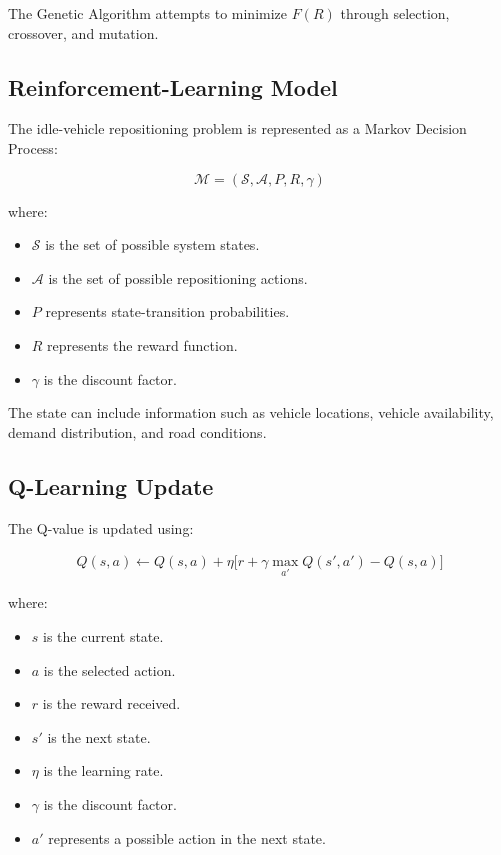 \documentclass[12pt,a4paper]{article}
\begin{document}
The Genetic Algorithm attempts to minimize $F(R)$ through selection,
crossover, and mutation.





\subsection{Reinforcement-Learning Model}

The idle-vehicle repositioning problem is represented as a Markov
Decision Process:

\begin{equation}
    \mathcal{M}
    =
    (\mathcal{S},\mathcal{A},P,R,\gamma)
    \label{eq:mdp}
\end{equation}

where:

\begin{itemize}
    \item $\mathcal{S}$ is the set of possible system states.
    \item $\mathcal{A}$ is the set of possible repositioning actions.
    \item $P$ represents state-transition probabilities.
    \item $R$ represents the reward function.
    \item $\gamma$ is the discount factor.
\end{itemize}

The state can include information such as vehicle locations,
vehicle availability, demand distribution, and road conditions.





\subsection{Q-Learning Update}

The Q-value is updated using:

\begin{equation}
\begin{aligned}
Q(s,a)
\leftarrow
Q(s,a)
+
\eta
\Big[
r
+
\gamma
\max_{a'}
Q(s',a')
-
Q(s,a)
\Big]
\end{aligned}
\label{eq:qlearning}
\end{equation}

where:

\begin{itemize}
    \item $s$ is the current state.
    \item $a$ is the selected action.
    \item $r$ is the reward received.
    \item $s'$ is the next state.
    \item $\eta$ is the learning rate.
    \item $\gamma$ is the discount factor.
    \item $a'$ represents a possible action in the next state.
\end{itemize}
\end{document}
